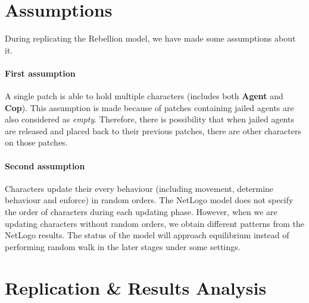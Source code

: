 \documentclass[11pt]{article}
\begin{document}
    
    \section{Assumptions}
        During replicating the Rebellion model, we have made some assumptions about
        it.
        \paragraph{First assumption} A single patch is able to hold multiple
        characters (includes both \textbf{Agent} and \textbf{Cop}). This assumption
        is made because of patches containing jailed agents are also considered
        as \textit{empty}. Therefore, there is possibility that when jailed agents
        are released and placed back to their previous patches, there are other 
        characters on those patches.
        \paragraph{Second assumption} Characters update their every behaviour (including
        movement, determine behaviour and enforce) in random orders. The NetLogo
        model does not specify the order of characters during each updating phase.
        However, when we are updating characters without random orders, we obtain
        different patterns from the NetLogo results. The status of the model will
        approach equilibrium instead of performing random walk in the later stages 
        under some settings.

    \section{Replication \& Results Analysis}
\end{document}
